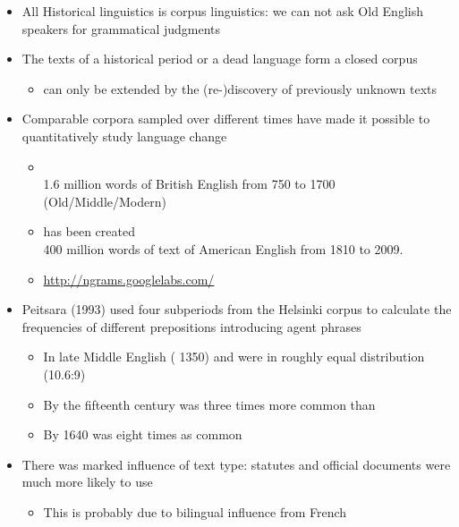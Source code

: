 \documentclass[a4paper,landscape,headrule,footrule,dvips]{foils}
\begin{document}
\begin{CJK}{UTF8}{min}
\begin{itemize}
\item All Historical linguistics is corpus linguistics: we can not ask
  Old English speakers for grammatical judgments
\item The texts of a historical period or a dead language form a closed corpus 
  \begin{itemize}  \item  can only be extended by the (re-)discovery of previously unknown texts
  \end{itemize}
\item Comparable corpora sampled over different times have made it
  possible to quantitatively study language change %
\begin{itemize}
\item {}
  \\ 1.6 million words of British English from 750 to 1700 (Old/Middle/Modern)
\item {} has been created
\\  400 million words of text of American English from 1810 to 2009. 
\item \url{http://ngrams.googlelabs.com/}
\end{itemize}
\end{itemize}



\begin{itemize}
\item  Peitsara (1993) used four subperiods from the Helsinki corpus to calculate the frequencies of different prepositions introducing agent phrases
  \begin{itemize}
  \item In late Middle English ( 1350)  and
     were in roughly equal distribution (10.6:9)
  \item By the fifteenth century  was three times more
    common than 
  \item By 1640  was eight times as common
  \end{itemize}
\item There was marked influence of text type: statutes and official
  documents were much more likely to use 
  \begin{itemize}
  \item This is probably due to bilingual influence from French
  \end{itemize}
\end{itemize}



\end{CJK}
\end{document}
